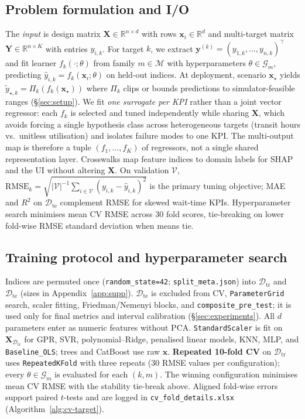 \documentclass[12pt,twocolumn,a4paper]{article}
\theoremstyle{plain}
\theoremstyle{definition}
\theoremstyle{remark}
\newcommand{\train}{\mathcal{D}_{\mathrm{tr}}}
\newcommand{\test}{\mathcal{D}_{\mathrm{te}}}
\newcommand{\R}{\mathbb{R}}
\begin{document}
\subsection{Problem formulation and I/O}
\label{sec:method-io}

The \emph{input} is design matrix $\mathbf{X} \in \R^{n \times d}$ with rows $\mathbf{x}_i \in \R^d$ and multi-target matrix $\mathbf{Y} \in \R^{n \times K}$ with entries $y_{i,k}$.
For target $k$, we extract $\mathbf{y}^{(k)} = (y_{1,k},\ldots,y_{n,k})^\top$ and fit learner $f_k(\cdot;\theta)$ from family $m \in \mathcal{M}$ with hyperparameters $\theta \in \mathcal{G}_m$, predicting $\hat{y}_{i,k} = f_k(\mathbf{x}_i;\theta)$ on held-out indices.
At deployment, scenario $\mathbf{x}_\star$ yields $\tilde{y}_{\star,k} = \Pi_k(f_k(\mathbf{x}_\star))$ where $\Pi_k$ clips or bounds predictions to simulator-feasible ranges (\S\ref{sec:setup}).
We fit \emph{one surrogate per KPI} rather than a joint vector regressor: each $f_k$ is selected and tuned independently while sharing $\mathbf{X}$, which avoids forcing a single hypothesis class across heterogeneous targets (transit hours vs.\ unitless utilisation) and isolates failure modes to one KPI.
The multi-output map is therefore a tuple $(f_1,\ldots,f_K)$ of regressors, not a single shared representation layer.
Crosswalks map feature indices to domain labels for SHAP and the UI without altering $\mathbf{X}$.
On validation $\mathcal{V}$, $\mathrm{RMSE}_k = \sqrt{|\mathcal{V}|^{-1}\sum_{i \in \mathcal{V}} (y_{i,k} - \hat{y}_{i,k})^2}$ is the primary tuning objective; MAE and $R^2$ on $\test$ complement RMSE for skewed wait-time KPIs.
Hyperparameter search minimises mean CV RMSE across $30$ fold scores, tie-breaking on lower fold-wise RMSE standard deviation when means tie.

\subsection{Training protocol and hyperparameter search}
\label{sec:method-protocol}

Indices are permuted once (\texttt{random\_state=42}; \texttt{split\_meta.json}) into $\train$ and $\test$ (sizes in Appendix~\ref{app:supp}).
$\test$ is excluded from CV, \texttt{ParameterGrid} search, scaler fitting, Friedman/Nemenyi blocks, and \texttt{composite\_pre\_test}; it is used only for final metrics and interval calibration (\S\ref{sec:experiments}).
All $d$ parameters enter as numeric features without PCA.
\texttt{StandardScaler} is fit on $\mathbf{X}_{\train}$ for GPR, SVR, polynomial--Ridge, penalised linear models, KNN, MLP, and \texttt{Baseline\_OLS}; trees and CatBoost use raw $\mathbf{x}$.
\textbf{Repeated 10-fold CV} on $\train$ uses \texttt{RepeatedKFold} with three repeats ($30$ RMSE values per configuration); every $\theta \in \mathcal{G}_m$ is evaluated for each $(k,m)$.
The winning configuration minimises mean CV RMSE with the stability tie-break above.
Aligned fold-wise errors support paired $t$-tests and are logged in \texttt{cv\_fold\_details.xlsx} (Algorithm~\ref{alg:cv-target}).
\end{document}
